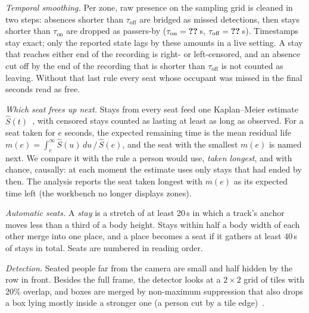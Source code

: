 \emph{Temporal smoothing.} Per zone, raw presence on the sampling grid is cleaned
in two steps: absences shorter than $\tau_{\mathrm{off}}$ are bridged as missed
detections, then stays shorter than $\tau_{\mathrm{on}}$ are dropped as
passers-by ($\tau_{\mathrm{on}} = \rqfour{on-sec}$\,s, $\tau_{\mathrm{off}} =
\rqfour{off-sec}$\,s). Timestamps stay exact; only the reported state lags by
these amounts in a live setting. A stay that reaches either end of the recording
is right- or left-censored, and an absence cut off by the end of the recording
that is shorter than $\tau_{\mathrm{off}}$ is not counted as leaving. Without
that last rule every seat whose occupant was missed in the final seconds read
as free.

\emph{Which seat frees up next.} Stays from every seat feed one Kaplan--Meier
estimate $\hat S(t)$~\cite{kaplan1958}, with censored stays counted as lasting
at least as long as observed. For a seat taken for $e$ seconds, the expected
remaining time is the mean residual life
$m(e) = \int_e^\infty \hat S(u)\,du \,/\, \hat S(e)$, and the seat with the
smallest $m(e)$ is named next. We compare it with the rule a person would use,
\emph{taken longest}, and with chance, causally: at each moment the estimate
uses only stays that had ended by then. The analysis reports the seat taken
longest with $m(e)$ as its expected time left (the workbench no longer displays
zones).

\emph{Automatic seats.} A \emph{stay} is a stretch of at least 20\,s in which a
track's anchor moves less than a third of a body height. Stays within half a
body width of each other merge into one place, and a place becomes a seat if it
gathers at least $40$\,s of stays in total. Seats are numbered in reading order.

\emph{Detection.} Seated people far from the camera are small and half hidden by
the row in front. Besides the full frame, the detector looks at a $2\times2$
grid of tiles with 20\% overlap, and boxes are merged by non-maximum
suppression that also drops a box lying mostly inside a stronger one (a person
cut by a tile edge)~\cite{akyon2022sahi}.

